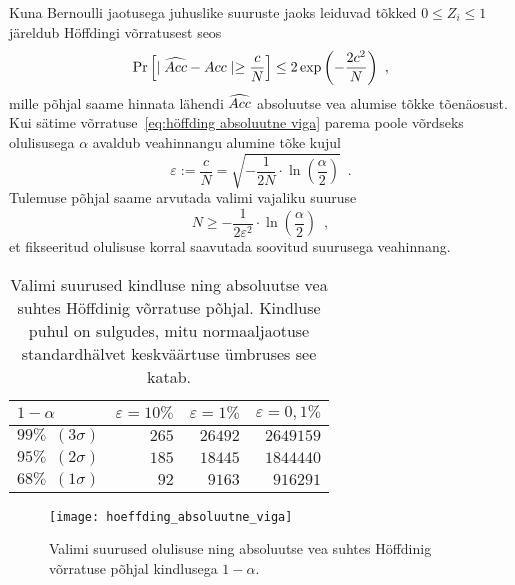 Kuna Bernoulli jaotusega juhuslike suuruste jaoks leiduvad tõkked $0 \leq Z_i \leq 1$ järeldub Höffdingi võrratusest seos
\begin{equation}
    \label{eq:höffding absoluutne viga}
    \Pr\left[\mid \widehat{Acc} - Acc \mid \geq \frac{c}{N}\right] \leq 2 \exp{\left( - \frac{2 c^2}{N} \right)} \enspace,
\end{equation}
mille põhjal saame hinnata lähendi $\widehat{Acc}$ absoluutse vea alumise tõkke tõenäosust. Kui sätime võrratuse~\eqref{eq:höffding absoluutne viga} parema poole võrdseks olulisusega $\alpha$ avaldub veahinnangu alumine tõke kujul
\begin{equation*}
     \varepsilon := \frac{c}{N} = \sqrt{- \frac{1}{2 N} \cdot \ln{\left( \frac{\alpha}{2} \right)}} \enspace.
\end{equation*}
Tulemuse põhjal saame arvutada valimi vajaliku suuruse
\begin{equation*}
    N \geq - \frac{1}{2 \varepsilon^2} \cdot \ln{\left( \frac{\alpha}{2} \right)} \enspace,
\end{equation*}
et fikseeritud olulisuse korral saavutada soovitud suurusega veahinnang.

\begin{table}[H]
    \centering
    \caption{Valimi suurused kindluse ning absoluutse vea suhtes Höffdinig võrratuse põhjal. Kindluse puhul on sulgudes, mitu normaaljaotuse standardhälvet keskväärtuse ümbruses see katab.}
    \begin{tabular}{l | r r r}
        $1-\alpha$ & $\varepsilon=10\%$ & $\varepsilon=1\%$ & $\varepsilon=0{,}1\%$ \\
    	\hline
    	$99\% \enspace (3\sigma)$ & $265$ & $26492$ & $2649159$ \\
    	$95\% \enspace (2\sigma)$ & $185$ & $18445$ & $1844440$ \\
    	$68\% \enspace (1\sigma)$ & $92$  & $9163$  & $916291$  \\
    \end{tabular}
    \label{tab:höffding absoluutne viga}
\end{table}

\begin{figure}[H]
    \begin{center}
        \texttt{[image: hoeffding\_absoluutne\_viga]}
    \end{center}
    \caption{Valimi suurused olulisuse ning absoluutse vea suhtes Höffdinig võrratuse põhjal kindlusega $1-\alpha$.}
    \label{fig:höffding absoluutne viga}
\end{figure}

